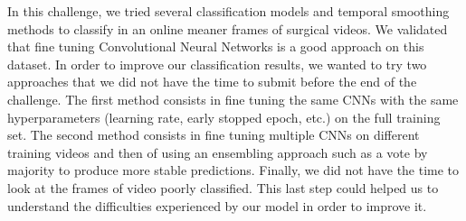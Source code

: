 \documentclass[10pt,twocolumn,letterpaper]{article}
\begin{document}
In this challenge, we tried several classification models and temporal smoothing methods to classify in an online meaner frames of surgical videos. We validated that fine tuning Convolutional Neural Networks is a good approach on this dataset. In order to improve our classification results, we wanted to try two approaches that we did not have the time to submit before the end of the challenge. The first method consists in fine tuning the same CNNs with the same hyperparameters (learning rate, early stopped epoch, etc.) on the full training set. The second method consists in fine tuning multiple CNNs on different training videos and then of using an ensembling approach such as a vote by majority to produce more stable predictions. Finally, we did not have the time to look at the frames of video poorly classified. This last step could helped us to understand the difficulties experienced by our model in order to improve it.







{\small


}
\end{document}
